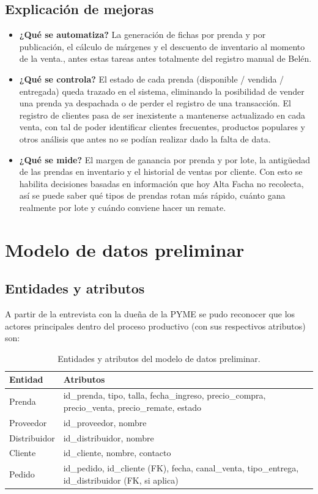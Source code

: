 \documentclass[11pt,letterpaper]{article}
\begin{document}
\subsection*{Explicación de mejoras}
\begin{itemize}
    \item \textbf{¿Qué se automatiza?} La generación de fichas por prenda y por publicación, el cálculo de márgenes y el descuento de inventario al momento de la venta., antes estas tareas antes totalmente del registro manual de Belén.
    \item \textbf{¿Qué se controla?} El estado de cada prenda (disponible / vendida / entregada) queda trazado en el sistema, eliminando la posibilidad de vender una prenda ya despachada o de perder el registro de una transacción. El registro de clientes pasa de ser inexistente a mantenerse actualizado en cada venta, con tal de poder identificar clientes frecuentes, productos populares y otros análisis que antes no se podían realizar dado la falta de data. 
    \item \textbf{¿Qué se mide?} El margen de ganancia por prenda y por lote, la antigüedad de las prendas en inventario y el historial de ventas por cliente. Con esto se habilita decisiones basadas en información que hoy Alta Facha no recolecta, así se puede saber qué tipos de prendas rotan más rápido, cuánto gana realmente por lote y cuándo conviene hacer un remate.
\end{itemize}

\newpage

\section{Modelo de datos preliminar}
\subsection*{Entidades y atributos}

A partir de la entrevista con la dueña de la PYME se pudo reconocer que los actores principales dentro del proceso productivo (con sus respectivos atributos) son:

\begin{table}[H]
\centering
\begin{tabular}{|l|p{10cm}|}
\hline
\textbf{Entidad} & \textbf{Atributos} \\
\hline
Prenda & id\_prenda, tipo, talla, fecha\_ingreso, precio\_compra, precio\_venta, precio\_remate, estado \\
\hline
Proveedor & id\_proveedor, nombre \\
\hline
Distribuidor & id\_distribuidor, nombre \\
\hline
Cliente & id\_cliente, nombre, contacto \\
\hline
Pedido & id\_pedido, id\_cliente (FK), fecha, canal\_venta, tipo\_entrega, id\_distribuidor (FK, si aplica) \\
\hline
\end{tabular}
\caption{Entidades y atributos del modelo de datos preliminar.}
\label{tab:entidades}
\end{table}
\end{document}
